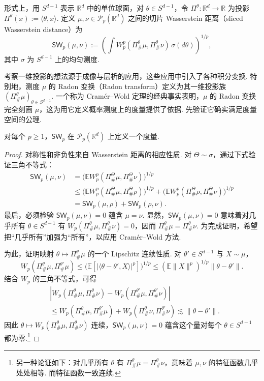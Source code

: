 形式上，用 $S^{d-1}$ 表示 $\mathbb R^d$ 中的单位球面，对 $\theta\in S^{d-1}$，令 $\Pi^\theta:\mathbb R^d\to\mathbb R$ 为投影 $\Pi^\theta(x):=\langle\theta,x\rangle$. 定义 $\mu,\nu\in\mathcal P_p(\mathbb R^d)$ 之间的切片 Wasserstein 距离（sliced Wasserstein distance）为
\begin{equation}\label{eq:2.20}
\mathsf{SW}_p(\mu,\nu):=\left(\int W_p^p(\Pi^\theta_\#\mu,\Pi^\theta_\#\nu)\,\sigma(d\theta)\right)^{1/p},
\end{equation}
其中 $\sigma$ 为 $S^{d-1}$ 上的均匀测度.

考察一维投影的想法源于成像与层析的应用，这些应用中引入了各种积分变换. 特别地，测度 $\mu$ 的 Radon 变换（Radon transform）定义为其一维投影族 $(\Pi^\theta_\#\mu)_{\theta\in S^{d-1}}$. 一个称为 Cramér--Wold 定理的经典事实表明，$\mu$ 的 Radon 变换完全刻画 $\mu$，这为用它定义概率测度上的度量提供了依据. 先验证它确实满足度量空间的公理.
\begin{theorem}\label{thm:2.25}
对每个 $p\ge1$，$\mathsf{SW}_p$ 在 $\mathcal P_p(\mathbb R^d)$ 上定义一个度量.
\end{theorem}
\begin{proof}
对称性和非负性来自 Wasserstein 距离的相应性质. 对 $\Theta\sim\sigma$，通过下式验证三角不等式：
$$\begin{aligned}
\mathsf{SW}_p(\mu,\nu)
&=\bigl(\mathbb EW_p^p(\Pi^\Theta_\#\mu,\Pi^\Theta_\#\nu)\bigr)^{1/p}\\
&\le\bigl(\mathbb EW_p^p(\Pi^\Theta_\#\mu,\Pi^\Theta_\#\rho)\bigr)^{1/p}
+\bigl(\mathbb EW_p^p(\Pi^\Theta_\#\rho,\Pi^\Theta_\#\nu)\bigr)^{1/p}\\
&=\mathsf{SW}_p(\mu,\rho)+\mathsf{SW}_p(\rho,\nu).
\end{aligned}$$
最后，必须检验 $\mathsf{SW}_p(\mu,\nu)=0$ 蕴含 $\mu=\nu$. 显然，$\mathsf{SW}_p(\mu,\nu)=0$ 意味着对几乎所有 $\theta\in S^{d-1}$ 有 $W_p(\Pi^\theta_\#\mu,\Pi^\theta_\#\nu)=0$，因而 $\Pi^\theta_\#\mu=\Pi^\theta_\#\nu$. 为完成证明，希望把“几乎所有”加强为“所有”，以应用 Cramér--Wold 方法.

为此，证明映射 $\theta\mapsto\Pi^\theta_\#\mu$ 的一个 Lipschitz 连续性质. 对 $\theta'\in S^{d-1}$ 与 $X\sim\mu$，
$$W_p(\Pi^\theta_\#\mu,\Pi^{\theta'}_\#\mu)
\le\bigl(\mathbb E[|\langle\theta-\theta',X\rangle|^p]\bigr)^{1/p}
\le(\mathbb E\lVert X\rVert^p)^{1/p}\lVert\theta-\theta'\rVert.$$
结合 $W_p$ 的三角不等式，可得
$$\begin{aligned}
&|W_p(\Pi^\theta_\#\mu,\Pi^\theta_\#\nu)-W_p(\Pi^{\theta'}_\#\mu,\Pi^{\theta'}_\#\nu)|\\
&\le W_p(\Pi^\theta_\#\mu,\Pi^{\theta'}_\#\mu)+W_p(\Pi^\theta_\#\nu,\Pi^{\theta'}_\#\nu)
\lesssim\lVert\theta-\theta'\rVert.
\end{aligned}$$
因此 $\theta\mapsto W_p(\Pi^\theta_\#\mu,\Pi^\theta_\#\nu)$ 连续，$\mathsf{SW}_p(\mu,\nu)=0$ 蕴含这个量对每个 $\theta\in S^{d-1}$ 都为零.\footnote{另一种论证如下：对几乎所有 $\theta$ 有 $\Pi^\theta_\#\mu=\Pi^\theta_\#\nu$，意味着 $\mu,\nu$ 的特征函数几乎处处相等. 而特征函数一致连续.}
\end{proof}
